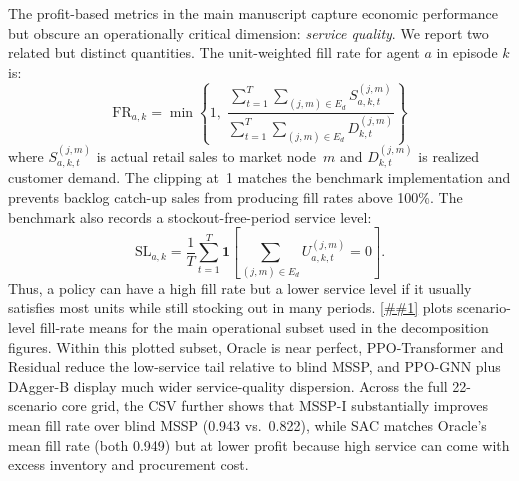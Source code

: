 \documentclass[10pt,a4paper]{article}
\providecommand{\Cref}[1]{\ref{##1}}
\begin{document}
The profit-based metrics in the main manuscript capture economic
performance but obscure an operationally critical dimension:
\emph{service quality}. We report two related but distinct quantities.
The unit-weighted fill rate for agent $a$ in episode $k$ is:
\begin{equation}
  \text{FR}_{a,k}
  =
  \min\left\{1,\;
  \frac{\sum_{t=1}^{T}\sum_{(j,m)\in E_d} S_{a,k,t}^{(j,m)}}
       {\sum_{t=1}^{T}\sum_{(j,m)\in E_d} D_{k,t}^{(j,m)}}\right\}
\end{equation}
where $S_{a,k,t}^{(j,m)}$ is actual retail sales to market node~$m$
and $D_{k,t}^{(j,m)}$ is realized customer demand. The clipping at~1
matches the benchmark implementation and prevents backlog catch-up sales
from producing fill rates above 100\%. The benchmark also records a
stockout-free-period service level:
\begin{equation}
  \text{SL}_{a,k}
  =
  \frac{1}{T}\sum_{t=1}^{T}
  \mathbf{1}\!\left[
    \sum_{(j,m)\in E_d} U_{a,k,t}^{(j,m)} = 0
  \right].
\end{equation}
Thus, a policy can have a high fill rate but a lower service level if it
usually satisfies most units while still stocking out in many periods.
\Cref{fig:fill_rate_dist} plots scenario-level fill-rate means for the
main operational subset used in the decomposition figures. Within this
plotted subset, Oracle is near perfect, PPO-Transformer and Residual
reduce the low-service tail relative to blind MSSP, and PPO-GNN plus
DAgger-B display much wider service-quality dispersion. Across the full
22-scenario core grid, the CSV further shows that MSSP-I substantially
improves mean fill rate over blind MSSP (0.943 vs.\ 0.822), while SAC
matches Oracle's mean fill rate (both 0.949) but at lower profit because
high service can come with excess inventory and procurement cost.
\end{document}
